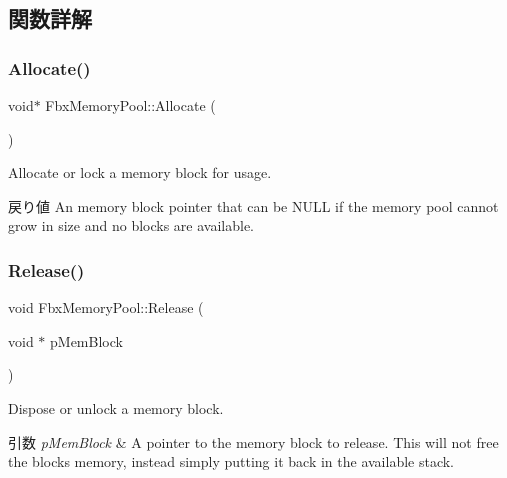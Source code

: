 \subsection{関数詳解}
\mbox{\label{class_fbx_memory_pool_aeccd6cbfc4f43a28fa16744a52ea877a}} 
\subsubsection{\texorpdfstring{Allocate()}{Allocate()}}
{\footnotesize\ttfamily void$\ast$ Fbx\+Memory\+Pool\+::\+Allocate (\begin{DoxyParamCaption}{ }\end{DoxyParamCaption})}

Allocate or lock a memory block for usage. \begin{DoxyReturn}{戻り値}
An memory block pointer that can be N\+U\+LL if the memory pool cannot grow in size and no blocks are available. 
\end{DoxyReturn}
\mbox{\label{class_fbx_memory_pool_adcac349666eea1d48455cfed673e4144}} 
\subsubsection{\texorpdfstring{Release()}{Release()}}
{\footnotesize\ttfamily void Fbx\+Memory\+Pool\+::\+Release (\begin{DoxyParamCaption}\item[{void $\ast$}]{p\+Mem\+Block }\end{DoxyParamCaption})}

Dispose or unlock a memory block. 
\begin{DoxyParams}{引数}
{\em p\+Mem\+Block} & A pointer to the memory block to release. This will not free the block\textquotesingle{}s memory, instead simply putting it back in the available stack. \\
\hline
\end{DoxyParams}
\mbox{\label{class_fbx_memory_pool_a9bd2739def7e1af783a5b97b83c3e8ff}} 
